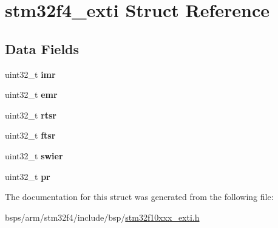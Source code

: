 \hypertarget{structstm32f4__exti}{}\section{stm32f4\+\_\+exti Struct Reference}
\label{structstm32f4__exti}
\subsection*{Data Fields}
\begin{DoxyCompactItemize}
\item 
\mbox{\label{structstm32f4__exti_af1f161e82bd889672fb8ef30dc992504}} 
uint32\+\_\+t {\bfseries imr}
\item 
\mbox{\label{structstm32f4__exti_a25af5033883a0ecc7e1610bdcd7f7912}} 
uint32\+\_\+t {\bfseries emr}
\item 
\mbox{\label{structstm32f4__exti_a8a88441b455b9dff0d1aeb68dc4ff32f}} 
uint32\+\_\+t {\bfseries rtsr}
\item 
\mbox{\label{structstm32f4__exti_ac4f4d75d7e0a5ef27e4a198c887bb242}} 
uint32\+\_\+t {\bfseries ftsr}
\item 
\mbox{\label{structstm32f4__exti_a6928160ad82528ce09f88270c132090a}} 
uint32\+\_\+t {\bfseries swier}
\item 
\mbox{\label{structstm32f4__exti_a0e952ea515171fdf75ff35d706f60a6e}} 
uint32\+\_\+t {\bfseries pr}
\end{DoxyCompactItemize}


The documentation for this struct was generated from the following file\+:\begin{DoxyCompactItemize}
\item 
bsps/arm/stm32f4/include/bsp/\mbox{\hyperlink{stm32f10xxx__exti_8h}{stm32f10xxx\+\_\+exti.\+h}}\end{DoxyCompactItemize}
